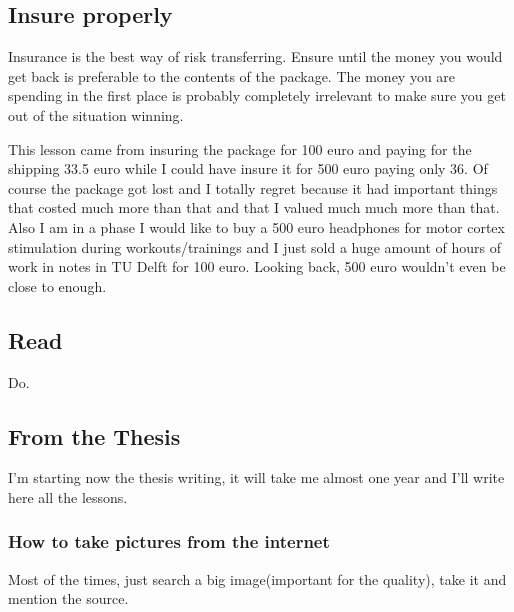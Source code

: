 \subsection{Insure properly}
Insurance is the best way of risk transferring. Ensure until the money you would get back is preferable to the contents of the package. The money you are spending in the first place is probably completely irrelevant to make sure you get out of the situation winning.

This lesson came from insuring the package for 100 euro and paying for the shipping 33.5 euro while I could have insure it for 500 euro paying only 36. Of course the package got lost and I totally regret because it had important things that costed much more than that and that I valued much much more than that. Also I am in a phase I would like to buy a 500 euro headphones for motor cortex stimulation during workouts/trainings and I just sold a huge amount of hours of work in notes in TU Delft for 100 euro. Looking back, 500 euro wouldn't even be close to enough.

\begin{center}
\end{center}



\subsection{Read}

Do.






















\subsection{From the Thesis}

I'm starting now the thesis writing, it will take me almost one year and I'll write here all the lessons.

\subsubsection{How to take pictures from the internet}
Most of the times, just search a big image(important for the quality), take it and mention the source.

